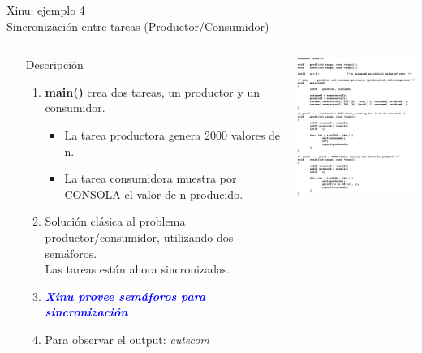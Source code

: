 \documentclass[8pt,aspectratio=169,compress]{beamer}
\begin{document}
\begin{frame}[fragile]{Xinu: ejemplo 4 \\ Sincronización entre tareas (Productor/Consumidor)}

    \begin{columns}[onlytextwidth,T]
      \column{\dimexpr\linewidth-70mm-5mm}

\begin{small}
\begin{itemize}
\bigskip
  \item[Descripción]
\begin{enumerate}
\item \textbf{main()} crea dos tareas, un productor y un consumidor.
	\begin{itemize}
\item La tarea productora genera 2000 valores de n.
\item La tarea consumidora muestra por CONSOLA el valor de n producido.
	\end{itemize}

\bigskip
\item Solución clásica al problema productor/consumidor, utilizando dos semáforos. \\ Las tareas están ahora sincronizadas.

\bigskip
\item \textbf{\textit{\textcolor{blue}{Xinu provee semáforos para sincronización}}}
\bigskip
\item Para observar el output: \textit{cutecom}
\end{enumerate}
	\end{itemize}

\end{small}

      \column{70mm}
     \includegraphics[width=60mm]{images/xinu-ejemplo5.jpg}

    \end{columns}
\end{frame}
\end{document}

